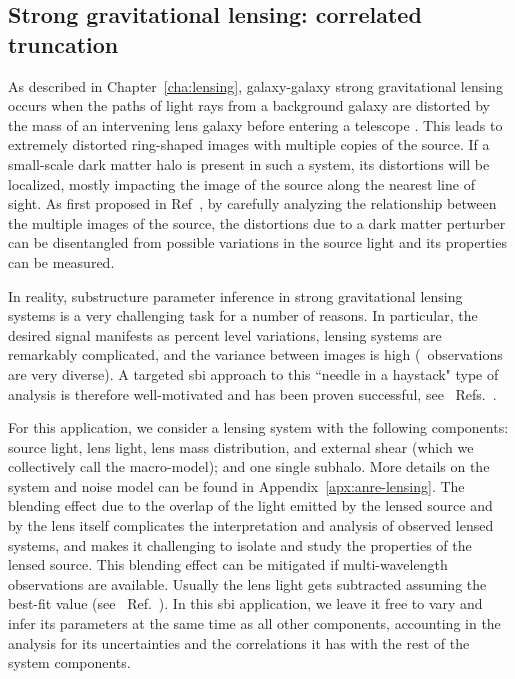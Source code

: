 \subsection{Strong gravitational lensing: correlated truncation} \label{subsec:lensing}

As described in Chapter~\ref{cha:lensing}, galaxy-galaxy strong gravitational lensing occurs when the paths of light rays from a background galaxy are distorted by the mass of an intervening lens galaxy before entering a telescope \cite{Meneghetti:2016aa}. This leads to extremely distorted ring-shaped images with multiple copies of the source. If a small-scale dark matter halo is present in such a system, its distortions will be localized, mostly impacting the image of the source along the nearest line of sight. As first proposed in Ref~\cite{Mao:1997ek}, by carefully analyzing the relationship between the multiple images of the source, the distortions due to a dark matter perturber can be disentangled from possible variations in the source light and its properties can be measured.

In reality, substructure parameter inference in strong gravitational lensing systems is a very challenging task for a number of reasons. In particular, the desired signal manifests as percent level variations, lensing systems are remarkably complicated, and the variance between images is high (\ie~observations are very diverse). A targeted \gls*{sbi} approach to this ``needle in a haystack" type of analysis is therefore well-motivated and has been proven successful, see \eg~Refs.~\cite{Coogan:2020yux, Coogan:2022cky}. 

For this application, we consider a lensing system with the following components: source light, lens light, lens mass distribution, and external shear (which we collectively call the macro-model); and one single subhalo. More details on the system and noise model can be found in Appendix~\ref{apx:anre-lensing}. The blending effect due to the overlap of the light emitted by the lensed source and by the lens itself complicates the interpretation and analysis of observed lensed systems, and makes it challenging to isolate and study the properties of the lensed source. This blending effect can be mitigated if multi-wavelength observations are available. Usually the lens light gets subtracted assuming the best-fit value (see \eg~Ref.~\cite{Vegetti:2012mc}). In this \gls*{sbi} application, we leave it free to vary and infer its parameters at the same time as all other components, accounting in the analysis for its uncertainties and the correlations it has with the rest of the system components.

